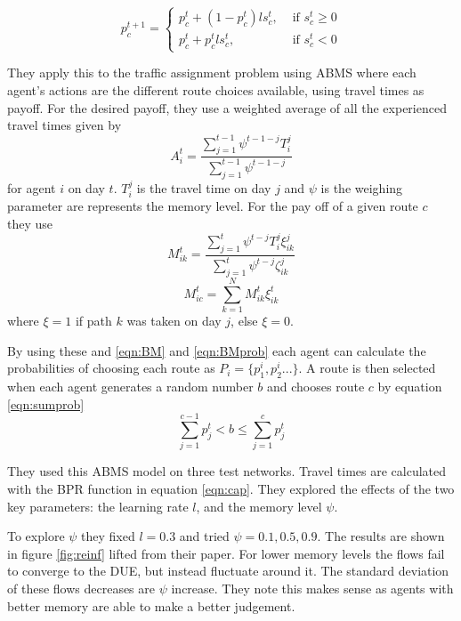 \documentclass[12pt, a4paper, onecolumn]{article}
\begin{document}
\begin{equation}
	p_{c}^{t+1}=\left\{\begin{array}{ll}
		p_{c}^{t}+\left(1-p_{c}^{t}\right) l s_{c}^{t}, & \text { if } s_{c}^{t} \geq 0 \\
		p_{c}^{t}+p_{c}^{t} l s_{c}^{t}, & \text { if } s_{c}^{t}<0
		\end{array}\right.
	\label{eqn:BMprob}
\end{equation}

They apply this to the traffic assignment problem using ABMS where each agent's actions are the different route choices available, using travel times as payoff. For the desired payoff, they use a weighted average of all the experienced travel times given by %
\begin{equation*}
	A_{i}^{t}=\frac{\sum_{j=1}^{t-1} \psi^{t-1-j} T_{i}^{j}}{\sum_{j=1}^{t-1} \psi^{t-1-j}}
	\label{eqn:ET}
	\end{equation*}
for agent $i$ on day $t$. $T_{i}^{j}$ is the travel time on day $j$ and $\psi$ is the weighing parameter are represents the memory level. For the pay off of a given route $c$ they use %
\begin{equation*}
	M_{i k}^{t}=\frac{\sum_{j=1}^{t} \psi^{t-j} T_{i}^{j} \xi_{i k}^{j}}{\sum_{j=1}^{t} \psi^{t-j} \zeta_{i k}^{j}}
	\label{eqn:PT}
	\end{equation*}
\begin{equation*}
	M_{i c}^{t}=\sum_{k=1}^{N} M_{i k}^{t} \xi_{i k}^{t}
	\label{eqn:PT2}
	\end{equation*}
 where $\xi = 1$ if path $k$ was taken on day $j$, else $\xi = 0$.

 By using these and \ref{eqn:BM} and \ref{eqn:BMprob} each agent can calculate the probabilities of choosing each route as $P_i = \{p^{i}_{1}, p^{i}_{2} ...\}$. A route is then selected when each agent generates a random number $b$ and chooses route $c$ by equation \ref{eqn:sumprob}
 \begin{equation}
	\sum_{j=1}^{c-1} p_{j}^{t}<b \leq \sum_{j=1}^{c} p_{j}^{t}
	\label{eqn:sumprob}
 \end{equation}

 They used this ABMS model on three test networks. Travel times are calculated with the BPR function in equation \ref{eqn:cap}. They explored the effects of the two key parameters: the learning rate $l$, and the memory level $\psi$.

 To explore $\psi$ they fixed $l = 0.3$ and tried $\psi = 0.1, 0.5, 0.9$. The results are shown in figure \ref{fig:reinf} lifted from their paper. For lower memory levels the flows fail to converge to the DUE, but instead fluctuate around it. The standard deviation of these flows decreases are $\psi$ increase. They note this makes sense as agents with better memory are able to make a better judgement. 
\end{document}
